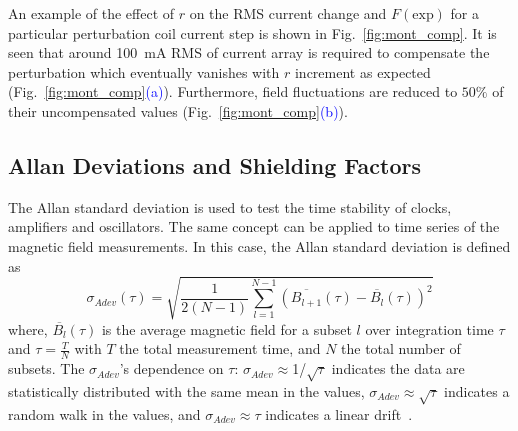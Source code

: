 An example of the effect of $r$ on the RMS current change  and $F(\mathrm{exp})$ for a particular perturbation coil current step is shown in Fig.~\ref{fig:mont_comp}. It is seen that around 100~mA RMS of current array is required to compensate the perturbation
which eventually vanishes with $r$ increment as expected (Fig.~\ref{fig:mont_comp}\textcolor{blue}{(a)}). Furthermore, field fluctuations are reduced to $50\%$ of their uncompensated values (Fig.~\ref{fig:mont_comp}\textcolor{blue}{(b)}).



 \subsection{Allan Deviations and Shielding Factors}
 
The Allan standard deviation \cite{allan} is used to test the time stability of clocks, amplifiers and oscillators. The same concept can be applied to time series of the magnetic field measurements. In this case, the Allan standard deviation is defined as~\cite{bea}
\begin{equation}\label{eq:adev}
    \sigma_{Adev} (\tau)=\sqrt{\frac{1}{2(N-1)}\sum_{l=1}^{N-1} \left(\overline{B_{l+1}}(\tau)-\overline{B_l}(\tau)\right)^2}
\end{equation}
where, $\overline{B_l}(\tau)$ is the average magnetic field for a subset $l$ over integration time $\tau$ and $\tau = \frac{T}{N}$ with $T$ the total measurement time, and $N$ the total number of subsets. The $\sigma_{Adev}$'s dependence on $\tau$: $\sigma_{Adev}\approx$1/$\sqrt{\tau}$ indicates the data are statistically distributed with the same mean in the values, $\sigma_{Adev}\approx \sqrt{\tau}$ indicates a random walk in the values, and $\sigma_{Adev}\approx \tau$ indicates a linear drift~\cite{allan_tau}. 



